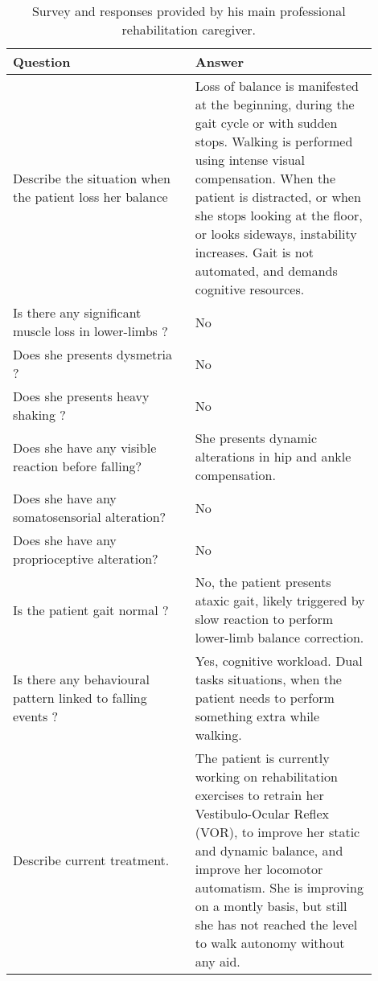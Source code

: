 \documentclass[conference]{IEEEtran}
\begin{document}
\begin{table*}[t]
\begin{center}
\begin{tabular}[!t]{|p{0.45\linewidth} |p{0.45\linewidth} |}
\hline
\textbf{Question} & \textbf{Answer} \\
\hline
\hline
Describe the situation when the patient loss her balance & Loss of balance is manifested at the beginning, during the gait cycle or with sudden stops. Walking is performed using intense visual compensation.   When the patient is distracted, or when she stops looking at the floor, or looks sideways, instability increases.  Gait  is not automated, and demands cognitive resources. \\
\hline
Is there any significant muscle loss in lower-limbs ? & No \\
\hline
Does she presents dysmetria ? & No \\
\hline
Does she presents heavy shaking ? & No \\
\hline
Does she have any visible reaction before falling?  & She presents dynamic alterations in hip and ankle compensation.\\
\hline
Does she have any somatosensorial alteration?  &  No \\
\hline
Does she have any proprioceptive alteration?  &  No \\
\hline
Is the patient gait normal ?  &  No, the patient presents ataxic gait, likely triggered by slow reaction to perform lower-limb balance correction. \\
\hline
Is there any behavioural pattern linked to falling events ? &  Yes, cognitive workload.  Dual tasks situations, when the patient needs to perform something extra while walking. \\
\hline
Describe current treatment. & The patient is currently working on rehabilitation exercises to retrain her Vestibulo-Ocular Reflex (VOR), to improve her static and dynamic balance, and improve her locomotor automatism.  She is improving on a montly basis, but still she has not reached the level to walk autonomy without any aid. \\
\hline
\end{tabular}
\vspace{10pt}
\caption{Survey and responses provided by his main professional rehabilitation caregiver.}
\label{tab:caregiverssurvey}
\end{center}
\end{table*}
\end{document}
